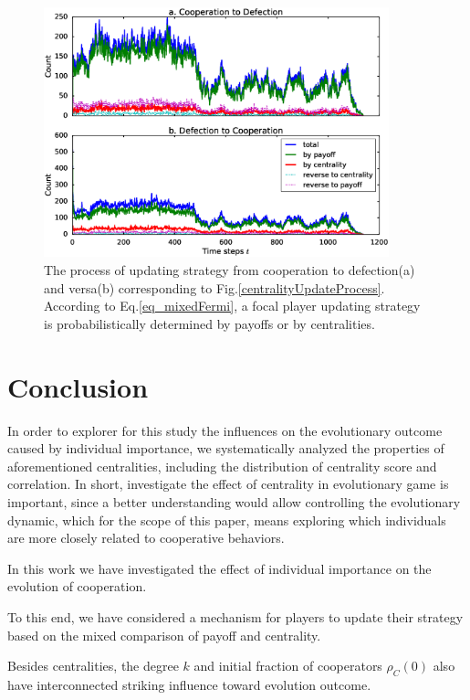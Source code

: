 \documentclass[preprint,12pt,3p]{elsarticle}
\begin{document}
\begin{figure}[htbp]
\centering
\includegraphics[width=10cm]{Powerlawk3centralityUpdateDetails.eps}
\caption{The process of updating strategy from cooperation to defection(a) and versa(b)
corresponding to Fig.\ref{centralityUpdateProcess}.
According to Eq.\ref{eq_mixedFermi}, a focal player updating strategy is probabilistically
determined by payoffs or by centralities.
 }
\label{centralityUpdateProcessDetails}
\end{figure}

\section{Conclusion}

    In order to explorer for this study the influences on the evolutionary outcome
caused by individual importance, we systematically analyzed the properties of aforementioned
centralities, including the distribution of centrality score and correlation.
   In short, investigate the effect of centrality in evolutionary game is important,
since a better understanding would allow controlling the evolutionary dynamic,
which for the scope of this paper, means exploring which individuals are
more closely related to cooperative behaviors.

In this work we have investigated the effect of individual importance on the evolution of cooperation.

To this end, we have considered a mechanism for players to update their strategy based on
the mixed comparison of payoff and centrality.


Besides centralities, the degree $k$ and initial fraction of cooperators $\rho_{C}(0)$
also have interconnected striking influence toward evolution outcome.
\end{document}
